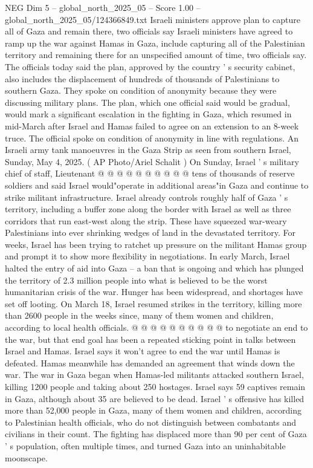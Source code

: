 \begin{textsample}{NEG Dim 5 – global\_north\_2025\_05 – Score 1.00 – global\_north\_2025\_05/124366849.txt}  \label{ex:f5_neg_373}
Israeli ministers approve plan to capture all of Gaza and remain there, two officials say Israeli ministers have agreed to ramp up the war against Hamas in Gaza, include capturing all of the Palestinian territory and remaining there for an unspecified amount of time, two officials say.
The officials today said the plan, approved by the country ' s security cabinet, also includes the displacement of hundreds of thousands of Palestinians to southern Gaza.
They spoke on condition of anonymity because they were discussing military plans.
The plan, which one official said would be gradual, would mark a significant escalation in the fighting in Gaza, which resumed in mid-March after Israel and Hamas failed to agree on an extension to an 8-week truce.
The official spoke on condition of anonymity in line with regulations.
An Israeli army tank manoeuvres in the Gaza Strip as seen from southern Israel, Sunday, May 4, 2025. ( AP Photo/Ariel Schalit ) On Sunday, Israel ' s military chief of staff, Lieutenant @ @ @ @ @ @ @ @ @ @ tens of thousands of reserve soldiers and said Israel would"operate in additional areas"in Gaza and continue to strike militant infrastructure.
Israel already controls roughly half of Gaza ' s territory, including a buffer zone along the border with Israel as well as three corridors that run east-west along the strip.
These have squeezed war-weary Palestinians into ever shrinking wedges of land in the devastated territory.
For weeks, Israel has been trying to ratchet up pressure on the militant Hamas group and prompt it to show more flexibility in negotiations.
In early March, Israel halted the entry of aid into Gaza -- a ban that is ongoing and which has plunged the territory of 2.3 million people into what is believed to be the worst humanitarian crisis of the war.
Hunger has been widespread, and shortages have set off looting.
On March 18, Israel resumed strikes in the territory, killing more than 2600 people in the weeks since, many of them women and children, according to local health officials. @ @ @ @ @ @ @ @ @ @ to negotiate an end to the war, but that end goal has been a repeated sticking point in talks between Israel and Hamas.
Israel says it won't agree to end the war until Hamas is defeated.
Hamas meanwhile has demanded an agreement that winds down the war.
The war in Gaza began when Hamas-led militants attacked southern Israel, killing 1200 people and taking about 250 hostages.
Israel says 59 captives remain in Gaza, although about 35 are believed to be dead.
Israel ' s offensive has killed more than 52,000 people in Gaza, many of them women and children, according to Palestinian health officials, who do not distinguish between combatants and civilians in their count.
The fighting has displaced more than 90 per cent of Gaza ' s population, often multiple times, and turned Gaza into an uninhabitable moonscape.

\end{textsample}
